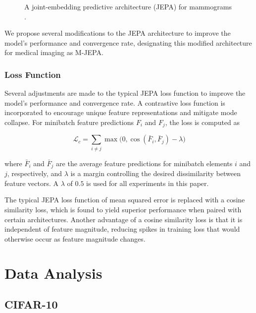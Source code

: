 \documentclass[12pt]{article}
\begin{document}
\begin{figure}
  \centering
  
  \caption{A joint-embedding predictive architecture (JEPA) for mammograms \cite{assran2023self}.}
  \label{fig:jepa}
\end{figure}


We propose several modifications to the JEPA architecture to improve the model's performance and convergence rate, designating this modified architecture for medical imaging as M-JEPA.

\subsubsection{Loss Function}

Several adjustments are made to the typical JEPA loss function to improve the model's performance and convergence rate. 
A contrastive loss function is incorporated to encourage unique feature representations and mitigate mode collapse.
For minibatch feature predictions $F_i$ and $F_j$, the loss is computed as

\begin{equation}
  \mathcal{L}_c = \sum_{i \neq j} \max\Big(0, \cos\left(\bar{F}_i, \bar{F}_j\right) - \lambda\Big)
\end{equation}

where $\bar{F}_i$ and $\bar{F}_j$ are the average feature predictions for minibatch elements $i$ and $j$, respectively, 
and $\lambda$ is a margin controlling the desired dissimilarity between feature vectors. A $\lambda$ of $0.5$ is used for all experiments in this paper.

The typical JEPA loss function of mean squared error is replaced with a cosine similarity loss, which is found to yield superior performance when paired
with certain architectures. Another advantage of a cosine similarity loss is that it is independent of feature magnitude, reducing spikes in training
loss that would otherwise occur as feature magnitude changes.




\section{Data Analysis}
\noindent

\subsection{CIFAR-10}
\end{document}
